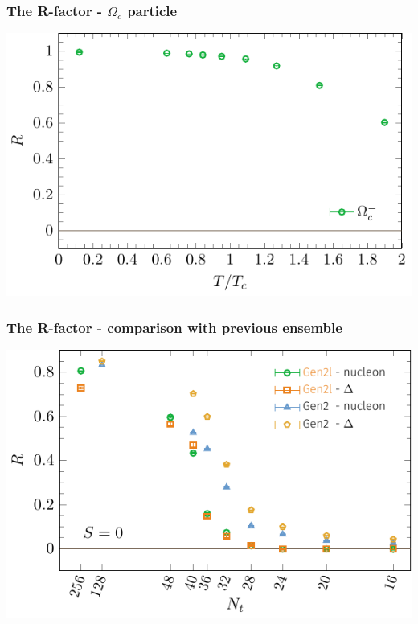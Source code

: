 \documentclass[11pt]{beamer}
\begin{document}
\begin{frame}
  \frametitle{The R-factor - $\Omega_c$ particle}

  \vspace{6mm}
  \begin{center}
    \hspace*{-5mm}
    \includegraphics[width=\textwidth]{plots/sumR_omega_c.pdf}
  \end{center}

\end{frame}

\begin{frame}
  \frametitle{The R-factor - comparison with previous ensemble}

  \vspace{6mm}
  \begin{center}
    \hspace*{-5mm}
    \includegraphics[width=\textwidth]{plots/sumR_compare.pdf}
  \end{center}

\end{frame}
\end{document}
